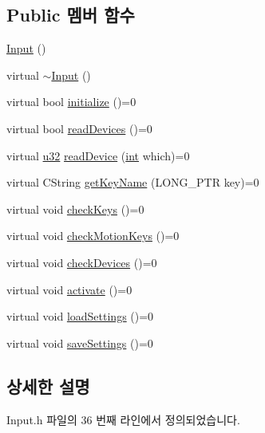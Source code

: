 \subsection*{Public 멤버 함수}
\begin{DoxyCompactItemize}
\item 
\mbox{\hyperlink{class_input_abae3f379d3f157cf42dc857309832dba}{Input}} ()
\item 
virtual \mbox{\hyperlink{class_input_a230646fa6e6433b4d9ac3535b7d52087}{$\sim$\+Input}} ()
\item 
virtual bool \mbox{\hyperlink{class_input_affd45f0c278a6ff71b7ae1a567a3dc1c}{initialize}} ()=0
\item 
virtual bool \mbox{\hyperlink{class_input_a422dbf7bc783378d47eddec93d1f565a}{read\+Devices}} ()=0
\item 
virtual \mbox{\hyperlink{_system_8h_a10e94b422ef0c20dcdec20d31a1f5049}{u32}} \mbox{\hyperlink{class_input_a57a47977bda8fcf6de237401b4c2e0dd}{read\+Device}} (\mbox{\hyperlink{_util_8cpp_a0ef32aa8672df19503a49fab2d0c8071}{int}} which)=0
\item 
virtual C\+String \mbox{\hyperlink{class_input_a2c4ec8a744b040657e220480987cd8bf}{get\+Key\+Name}} (L\+O\+N\+G\+\_\+\+P\+TR key)=0
\item 
virtual void \mbox{\hyperlink{class_input_a91418a5762e6e50aa4f59e4ce92d2dfa}{check\+Keys}} ()=0
\item 
virtual void \mbox{\hyperlink{class_input_aac8f25a1a6a7e0bd54e5d50b9b774844}{check\+Motion\+Keys}} ()=0
\item 
virtual void \mbox{\hyperlink{class_input_a7a6ef57ff2638f545380618b2d3fdf9d}{check\+Devices}} ()=0
\item 
virtual void \mbox{\hyperlink{class_input_a5917709c5d9cf1270d430667982895d1}{activate}} ()=0
\item 
virtual void \mbox{\hyperlink{class_input_a098708c062b906c84ab036c04d447a29}{load\+Settings}} ()=0
\item 
virtual void \mbox{\hyperlink{class_input_a90c42a9d91bf671aaee3d5f611199eec}{save\+Settings}} ()=0
\end{DoxyCompactItemize}


\subsection{상세한 설명}


Input.\+h 파일의 36 번째 라인에서 정의되었습니다.



